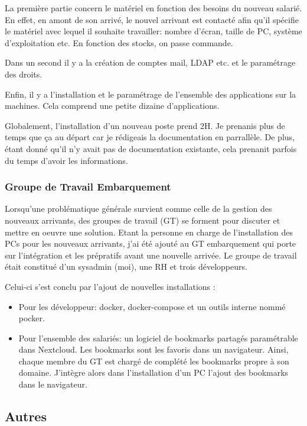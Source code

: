 \documentclass[12pt]{article}
\begin{document}
La première partie concern le matériel en fonction des besoins du nouveau salarié.
En effet, en amont de son arrivé, le nouvel arrivant est contacté afin qu'il spécifie le matériel avec lequel il souhaite travailler: nombre d'écran, taille de PC, système d'exploitation etc.
En fonction des stocks, on passe commande.

Dans un second il y a la création de comptes mail, LDAP etc. et le paramétrage des droits.

Enfin, il y a l'installation et le paramétrage de l'ensemble des applications sur la machines.
Cela comprend une petite dizaine d'applications.

Globalement, l'installation d'un nouveau poste prend 2H. 
Je prenanis plus de temps que ça au départ car je rédigeais la documentation en parrallèle. 
De plus, étant donné qu'il n'y avait pas de documentation existante, cela prenanit parfois du temps d'avoir les informations. 

\subsubsection{Groupe de Travail Embarquement}
Lorsqu'une problématique générale survient comme celle de la gestion des nouveaux arrivants, des groupes de travail (GT) se forment pour discuter et mettre en oeuvre une solution.
Etant la personne en charge de l'installation des PCs pour les nouveaux arrivants, j'ai été ajouté au GT embarquement qui porte sur l'intégration et les prépratifs avant une nouvelle arrivée.
Le groupe de travail était constitué d'un sysadmin (moi), une RH et trois développeurs.

Celui-ci s'est conclu par l'ajout de nouvelles installations :
\begin{itemize}
    \item Pour les développeur: docker, docker-compose et un outils interne nommé pocker.
    \item Pour l'ensemble des salariés: un logiciel de bookmarks partagés paramétrable dans Nextcloud.
    Les bookmarks sont les favoris dans un navigateur. 
    Ainsi, chaque membre du GT est chargé de complété les bookmarks propre à son domaine.
    J'intègre alors dans l'installation d'un PC l'ajout des bookmarks dans le navigateur.
\end{itemize}



\newpage
\subsection{Autres}
\end{document}
